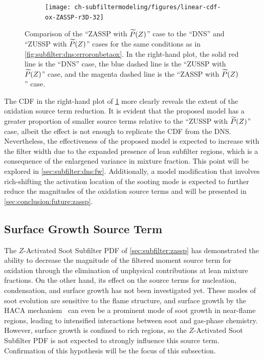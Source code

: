 \begin{figure}[ht]
\begin{subfigure}[b]{0.33\linewidth}
  \end{subfigure}%
  \begin{subfigure}[b]{0.33\linewidth}
    \centering
    \texttt{[image: ch-subfiltermodeling/figures/linear-cdf-ox-ZASSP-r3D-32]}
  \end{subfigure}
  \caption[Comparison of ZASSP with $\pz$ to DNS \& ZUSSP with $\pz$ for $\fst[M]{1,0}^{ox}$]{Comparison of the ``ZASSP with $\pz$'' case to the ``DNS'' and ``ZUSSP with $\pz$'' cases for the same conditions as in \cref{fig:subfilter:dns:erroronbetaox}. In the right-hand plot, the solid red line is the ``DNS'' case, the blue dashed line is the ``ZUSSP with $\pz$'' case, and the magenta dashed line is the ``ZASSP with $\pz$'' case.}
  \label{fig:subfilter:dns:zasspcomparisonox}
\end{figure}

The CDF in the right-hand plot of \cref{fig:subfilter:dns:zasspcomparisonox} more clearly reveals the extent of the oxidation source term reduction. It is evident that the proposed model has a greater proportion of smaller source terms relative to the ``ZUSSP with $\pz$'' case, albeit the effect is not enough to replicate the CDF from the DNS. Nevertheless, the effectiveness of the proposed model is expected to increase with the filter width due to the expanded presence of lean subfilter regions, which is a consequence of the enlargened variance in mixture fraction. This point will be explored in \cref{sec:subfilter:dns:fw}. Additionally, a model modification that involves rich-shifting the activation location of the sooting mode is expected to further reduce the magnitudes of the oxidation source terms and will be presented in \cref{sec:conclusion:future:zassp}.


\subsection{Surface Growth Source Term}
\label{sec:subfilter:dns:sg}

The $Z$-Activated Soot Subfilter PDF of \cref{sec:subfilter:zassp} has demonstrated the ability to decrease the magnitude of the filtered moment source term for oxidation through the elimination of unphysical contributions at lean mixture fractions. On the other hand, its effect on the source terms for nucleation, condensation, and surface growth has not been investigated yet. These modes of soot evolution are sensitive to the flame structure, and surface growth by the HACA mechanism~\cite{frenklach1985,frenklach1991} can even be a prominent mode of soot growth in near-flame regions, leading to intensified interactions between soot and gas-phase chemistry. However, surface growth is confined to rich regions, so the $Z$-Activated Soot Subfilter PDF is not expected to strongly influence this source term. Confirmation of this hypothesis will be the focus of this subsection.


